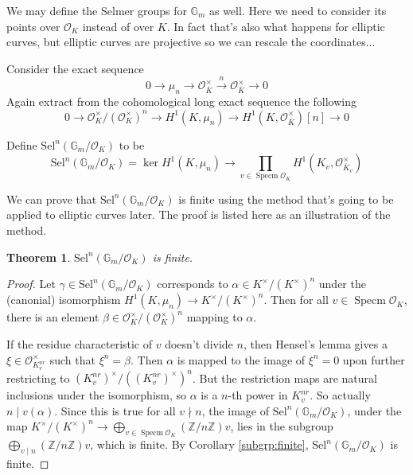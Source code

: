 \documentclass{article}
\newtheorem{thm}{Theorem}
\newcommand{\ord}{\mathcal{O}}
\newcommand{\mn}{\mu_{n}}
\newcommand{\kmkn}{K ^{\times} / (K ^{\times})^{n}}
\newcommand{\kvmkn}[1]{(#1) ^{\times} / ((#1) ^{\times})^{n}}
\DeclareMathOperator{\spec}{Specm}
\begin{document}
We may define the Selmer groups for $ \mathbb{G}_{m} $ as well.
Here we need to consider its points over $ \ord _{K} $ instead of over $ K $.
In fact that's also what happens for elliptic curves,
but elliptic curves are projective so we can rescale the coordinates...

Consider the exact sequence
$$ 0\to \mn\to \ord _{\overline{K}}^{\times}\xrightarrow{n} \ord _{\overline{K}}^{\times}\to 0 $$
Again extract from the cohomological long exact sequence the following
$$ 0\to \ord _{K}^{\times}/(\ord _{K}^{\times})^{n}
\to H ^{1}(K, \mn)\to H ^{1}(K, \ord _{\overline{K}}^{\times})[n]\to 0$$

Define $ \mathrm{Sel}^{n}(\mathbb{G}_{m}/\ord _{K}) $ to be 
$$ \mathrm{Sel}^{n}(\mathbb{G}_{m}/\ord _{K}) =
\ker H ^{1}(K, \mn)\to \prod _{v\in\spec \ord _{K}} H ^{1}(K _{v}, \ord _{\overline{K}_{v}}^{\times}) $$

We can prove that $ \mathrm{Sel}^{n}(\mathbb{G}_{m}/\ord _{K}) $ is finite using the method that's
going to be applied to elliptic curves later.
The proof is listed here as an illustration of the method.
\begin{thm}
$ \mathrm{Sel}^{n}(\mathbb{G}_{m}/\ord _{K}) $ is finite.
\end{thm}

\begin{proof}
Let $ \gamma\in \mathrm{Sel}^{n}(\mathbb{G}_{m}/\ord _{K}) $ corresponds to
$ \alpha\in \kmkn $ under the (canonial) isomorphism $ H ^{1}(K, \mn)\to \kmkn $.
Then for all $ v\in \spec\ord _{K} $, there is an element $ \beta\in
\ord _{K}^{\times}/(\ord _{K}^{\times})^{n}$ mapping to $ \alpha $.

If the residue characteristic of $ v $ doesn't divide $ n $,
then Hensel's lemma gives a $ \xi\in \ord _{K _{v}^{nr}}^{\times} $ such that
$ \xi ^{n} = \beta $.
Then $ \alpha $ is mapped to the image of $ \xi ^{n} = 0 $ upon further restricting to
$ \kvmkn{K _{v}^{nr}} $.
But the restriction maps are natural inclusions under the isomorphism,
so $ \alpha $ is a $ n $-th power in $ K _{v}^{nr} $.
So actually $ n\mid v (\alpha)$.
Since this is true for all $ v\nmid n $,
the image of $ \mathrm{Sel}^{n}(\mathbb{G}_{m}/\ord _{K}) $,
under the map $ \kmkn \to \bigoplus _{v\in \spec \ord _{K}} (\mathbb{Z}/n \mathbb{Z})v $,
lies in the subgroup
$ \bigoplus _{v\mid n} (\mathbb{Z}/n \mathbb{Z})v $, which is finite.
By Corollary \ref{subgrp:finite}, $ \mathrm{Sel}^{n}(\mathbb{G}_{m}/\ord _{K}) $ is finite. 
\end{proof}
\end{document}
